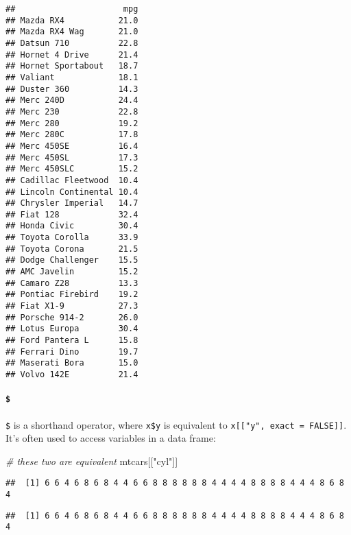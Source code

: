 \documentclass[
]{book}
\newenvironment{Shaded}{\begin{snugshade}}{\end{snugshade}}
\newcommand{\CommentTok}[1]{\textcolor[rgb]{0.56,0.35,0.01}{\textit{#1}}}
\newcommand{\NormalTok}[1]{#1}
\newcommand{\OperatorTok}[1]{\textcolor[rgb]{0.81,0.36,0.00}{\textbf{#1}}}
\newcommand{\StringTok}[1]{\textcolor[rgb]{0.31,0.60,0.02}{#1}}
\begin{document}
\begin{verbatim}
##                      mpg
## Mazda RX4           21.0
## Mazda RX4 Wag       21.0
## Datsun 710          22.8
## Hornet 4 Drive      21.4
## Hornet Sportabout   18.7
## Valiant             18.1
## Duster 360          14.3
## Merc 240D           24.4
## Merc 230            22.8
## Merc 280            19.2
## Merc 280C           17.8
## Merc 450SE          16.4
## Merc 450SL          17.3
## Merc 450SLC         15.2
## Cadillac Fleetwood  10.4
## Lincoln Continental 10.4
## Chrysler Imperial   14.7
## Fiat 128            32.4
## Honda Civic         30.4
## Toyota Corolla      33.9
## Toyota Corona       21.5
## Dodge Challenger    15.5
## AMC Javelin         15.2
## Camaro Z28          13.3
## Pontiac Firebird    19.2
## Fiat X1-9           27.3
## Porsche 914-2       26.0
## Lotus Europa        30.4
## Ford Pantera L      15.8
## Ferrari Dino        19.7
## Maserati Bora       15.0
## Volvo 142E          21.4
\end{verbatim}

\hypertarget{section-1}{%
\paragraph{\texorpdfstring{\texttt{\$}}{\$}}\label{section-1}}

\texttt{\$} is a shorthand operator, where \texttt{x\$y} is equivalent to \texttt{x{[}{[}"y",\ exact\ =\ FALSE{]}{]}}. It's often used to access variables in a data frame:

\begin{Shaded}
\begin{Highlighting}[]
\CommentTok{\# these two are equivalent}
\NormalTok{mtcars[[}\StringTok{"cyl"}\NormalTok{]]}
\end{Highlighting}
\end{Shaded}

\begin{verbatim}
##  [1] 6 6 4 6 8 6 8 4 4 6 6 8 8 8 8 8 8 4 4 4 4 8 8 8 8 4 4 4 8 6 8 4
\end{verbatim}

\begin{Shaded}
\end{Shaded}

\begin{verbatim}
##  [1] 6 6 4 6 8 6 8 4 4 6 6 8 8 8 8 8 8 4 4 4 4 8 8 8 8 4 4 4 8 6 8 4
\end{verbatim}
\end{document}
